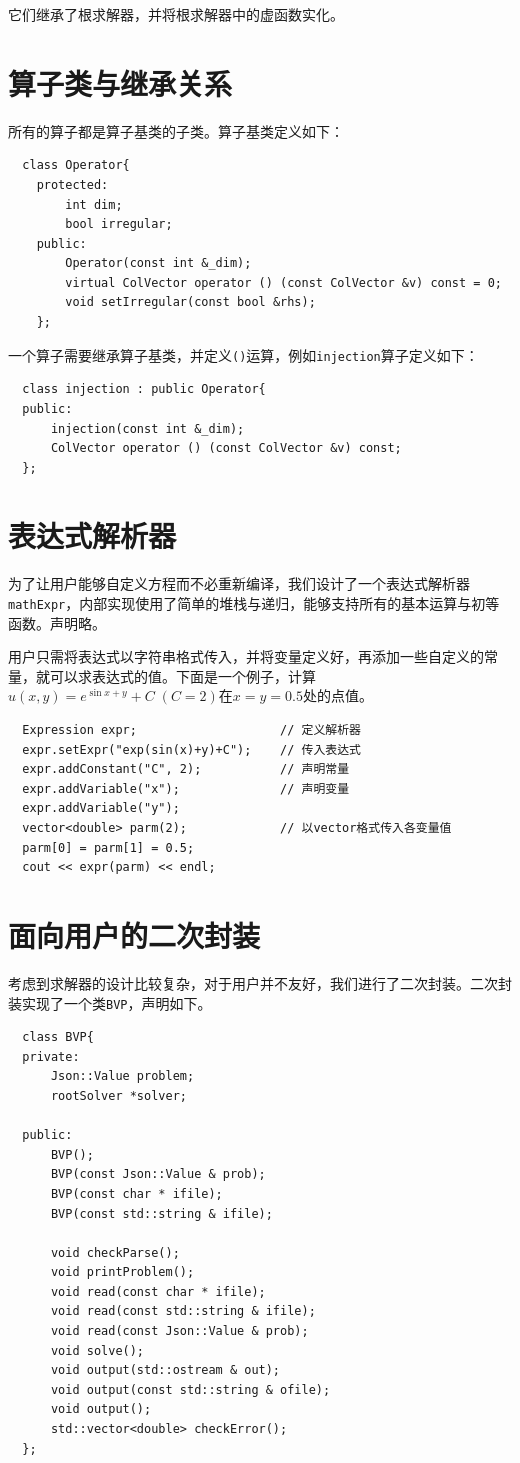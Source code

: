 \documentclass[lang=cn,10pt]{elegantbook}
\begin{document}
它们继承了根求解器，并将根求解器中的虚函数实化。

\section{算子类与继承关系}

所有的算子都是算子基类的子类。算子基类定义如下：
\begin{lstlisting}
  class Operator{
    protected:
        int dim;
        bool irregular;
    public:
        Operator(const int &_dim);
        virtual ColVector operator () (const ColVector &v) const = 0;
        void setIrregular(const bool &rhs);
    };
\end{lstlisting}

一个算子需要继承算子基类，并定义\verb|()|运算，例如\verb|injection|算子定义如下：
\begin{lstlisting}
  class injection : public Operator{
  public:
      injection(const int &_dim);
      ColVector operator () (const ColVector &v) const;
  };
\end{lstlisting}

\section{表达式解析器}

为了让用户能够自定义方程而不必重新编译，我们设计了一个表达式解析器\verb|mathExpr|，内部实现使用了简单的堆栈与递归，能够支持所有的基本运算与初等函数。声明略。

用户只需将表达式以字符串格式传入，并将变量定义好，再添加一些自定义的常量，就可以求表达式的值。下面是一个例子，计算$u(x,y)=e^{\sin x+y}+C\;(C=2)$在$x=y=0.5$处的点值。
\begin{lstlisting}
  Expression expr;                    // 定义解析器
  expr.setExpr("exp(sin(x)+y)+C");    // 传入表达式
  expr.addConstant("C", 2);           // 声明常量
  expr.addVariable("x");              // 声明变量
  expr.addVariable("y");
  vector<double> parm(2);             // 以vector格式传入各变量值
  parm[0] = parm[1] = 0.5;
  cout << expr(parm) << endl;
\end{lstlisting}

\section{面向用户的二次封装}

考虑到求解器的设计比较复杂，对于用户并不友好，我们进行了二次封装。二次封装实现了一个类\verb|BVP|，声明如下。
\begin{lstlisting}
  class BVP{
  private:
      Json::Value problem;
      rootSolver *solver;

  public:
      BVP();
      BVP(const Json::Value & prob);
      BVP(const char * ifile);
      BVP(const std::string & ifile);

      void checkParse();
      void printProblem();
      void read(const char * ifile);
      void read(const std::string & ifile);
      void read(const Json::Value & prob);
      void solve();
      void output(std::ostream & out);
      void output(const std::string & ofile);
      void output();
      std::vector<double> checkError();
  };
\end{lstlisting}
\end{document}
